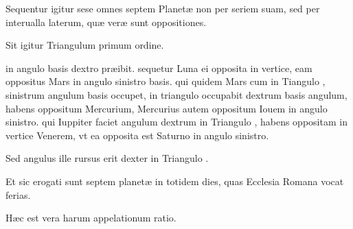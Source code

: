 \begin{parnumbers}

Sequentur igitur sese omnes septem Planetæ non per seriem suam, sed per interualla laterum, quæ veræ sunt oppositiones.

Sit igitur Triangulum  primum ordine.

 in angulo basis dextro præibit. sequetur Luna ei opposita in vertice, eam oppositus Mars in angulo sinistro basis. qui quidem Mars cum in Tiangulo , sinistrum angulum basis occupet, in triangulo  occupabit dextrum basis angulum, habens oppositum Mercurium, Mercurius autem oppositum Iouem in angulo sinistro. qui Iuppiter faciet angulum dextrum in Triangulo , habens oppositam in vertice  Venerem, vt ea opposita est Saturno in angulo sinistro.

Sed angulus ille rursus erit dexter in Triangulo .

Et sic erogati sunt septem planetæ in totidem dies, quas Ecclesia Romana vocat ferias.

Hæc est vera harum appelationum ratio.

\end{parnumbers}

